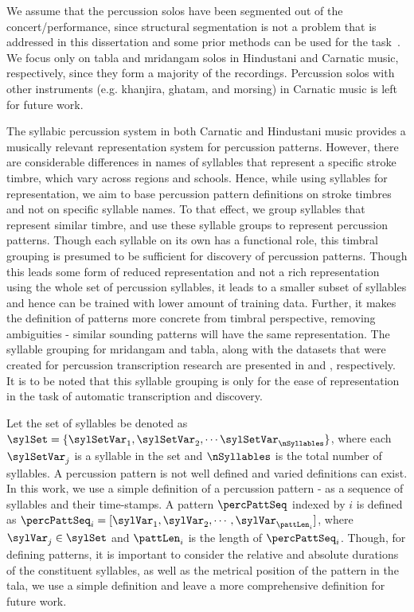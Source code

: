 We assume that the percussion solos have been segmented out of the concert/performance, since structural segmentation is not a problem that is addressed in this dissertation and some prior methods can be used for the task~\cite{sarala:13:concertseg}. We focus only on \gls{tabla} and mridangam solos in Hindustani and Carnatic music, respectively, since they form a majority of the recordings. Percussion solos with other instruments (e.g. \gls{khanjira}, \gls{ghatam}, and \gls{morsing}) in Carnatic music is left for future work. 

The syllabic percussion system in both Carnatic and Hindustani music provides a musically relevant representation system for percussion patterns. However, there are considerable differences in names of syllables that represent a specific stroke timbre, which vary across regions and schools. Hence, while using syllables for representation, we aim to base percussion pattern definitions on stroke timbres and not on specific syllable names. To that effect, we group syllables that represent similar timbre, and use these syllable groups to represent percussion patterns. Though each syllable on its own has a functional role, this timbral grouping is presumed to be sufficient for discovery of percussion patterns. Though this leads some form of reduced representation and not a rich representation using the whole set of percussion syllables, it leads to a smaller subset of syllables and hence can be trained with lower amount of training data. Further, it makes the definition of patterns more concrete from timbral perspective, removing ambiguities - similar sounding patterns will have the same representation. The syllable grouping for mridangam and \gls{tabla}, along with the datasets that were created for percussion transcription research are presented in  and , respectively. It is to be noted that this syllable grouping is only for the ease of representation in the task of automatic transcription and discovery. 

Let the set of syllables be denoted as $\sylSet = \{\sylSetVar_1, \sylSetVar_2, \cdots \sylSetVar_\nSyllables\}$, where each $\sylSetVar_j$ is a syllable in the set and $\nSyllables$ is the total number of syllables. A percussion pattern is not well defined and varied definitions can exist. In this work, we use a simple definition of a percussion pattern - as a sequence of syllables and their time-stamps. A pattern $\percPattSeq$ indexed by $i$ is defined as $\percPattSeq_i = [\sylVar_1, \sylVar_2, \cdots, \sylVar_{\pattLen_i}]$, where $\sylVar_j \in \sylSet$ and $\pattLen_i$ is the length of $\percPattSeq_i$. Though, for defining patterns, it is important to consider the relative and absolute durations of the constituent syllables, as well as the metrical position of the pattern in the \gls{tala}, we use a simple definition and leave a more comprehensive definition for future work. 

